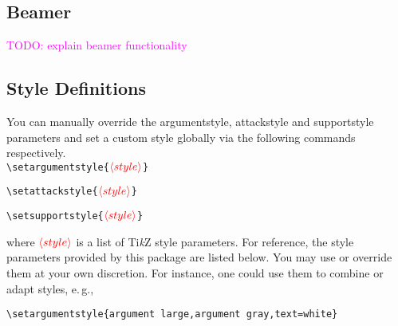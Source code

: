\documentclass[headings=normal]{scrartcl}
\newcommand{\todo}[1]{\textcolor{magenta}{TODO: #1}} %
\newcommand{\tikzname}{Ti\emph{k}Z\xspace}
\newcommand{\opt}[2][red]{\ensuremath{\textcolor{#1}{\langle #2\rangle}}}
\begin{document}
\subsection{Beamer}\label{sec:beamer}
\todo{explain beamer functionality}


\subsection{Style Definitions}\label{sec:style-definitions}
    You can manually override the \textsf{argumentstyle}, \textsf{attackstyle} and \textsf{supportstyle} parameters and set a custom style globally via the following commands respectively.\\

    \vspace{-0.3cm}
    \noindent
    \verb|\setargumentstyle{|\opt{style}\verb|}|
    
    \noindent
    \verb|\setattackstyle{|\opt{style}\verb|}|
    
    \noindent
    \verb|\setsupportstyle{|\opt{style}\verb|}|
    
    \begin{list}{}{\leftmargin=\parindent\rightmargin=0pt}
        \item
        where \opt{style} is a list of \tikzname style parameters.
        For reference, the style parameters provided by this package are listed below.
        You may use or override them at your own discretion.
        For instance, one could use them to combine or adapt styles, e.\,g.,

        \noindent
    \verb|\setargumentstyle{argument large,argument gray,text=white}|
    \end{list}
\end{document}
